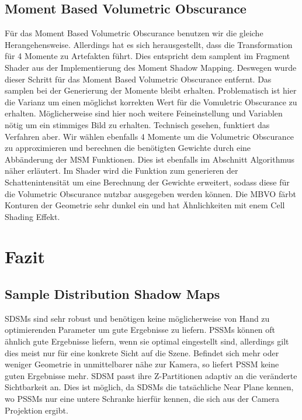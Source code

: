 \documentclass[runningheaders,a4paper]{llncs}
\begin{document}
\subsection{Moment Based Volumetric Obscurance}
Für das Moment Based Volumetric Obscurance benutzen wir die gleiche Herangehensweise. Allerdings hat es sich herausgestellt, dass die Transformation für 4 Momente zu Artefakten führt. Dies entspricht dem samplent im Fragment Shader aus der Implementierung des Moment Shadow Mapping. Deswegen wurde dieser Schritt für das Moment Based Volumetric Obscurance entfernt. Das samplen bei der Generierung der Momente bleibt erhalten. Problematisch ist hier die Varianz um einen möglichst korrekten Wert für die Vomuletric Obscurance zu erhalten. Möglicherweise sind hier noch weitere Feineinstellung und Variablen nötig um ein stimmiges Bild zu erhalten. Technisch gesehen, funktiert das Verfahren aber.
Wir wählen ebenfalls 4 Momente um die Volumetric Obscurance zu approximieren und berechnen die benötigten Gewichte durch eine Abbänderung der MSM Funktionen. Dies ist ebenfalls im Abschnitt Algorithmus näher erläutert.
Im Shader wird die Funktion zum generieren der Schattenintensität um eine Berechnung der Gewichte erweitert, sodass diese für die Volumetric Obscurance nutzbar ausgegeben werden können.
Die MBVO färbt Konturen der Geometrie sehr dunkel ein und hat Ähnlichkeiten mit enem Cell Shading Effekt.



\section{Fazit}


\subsection{Sample Distribution Shadow Maps}
SDSMs sind sehr robust und benötigen keine möglicherweise von Hand zu optimierenden Parameter um gute Ergebnisse zu liefern.
PSSMs können oft ähnlich gute Ergebnisse liefern, wenn sie optimal eingestellt sind, allerdings gilt dies meist nur für eine konkrete Sicht auf die Szene.
Befindet sich mehr oder weniger Geometrie in unmittelbarer nähe zur Kamera, so liefert PSSM keine guten Ergebnisse mehr.
SDSM passt ihre Z-Partitionen adaptiv an die veränderte Sichtbarkeit an.
Dies ist möglich, da SDSMs die tatsächliche Near Plane kennen, wo PSSMs nur eine untere Schranke hierfür kennen, die sich aus der Camera Projektion ergibt.
\end{document}
